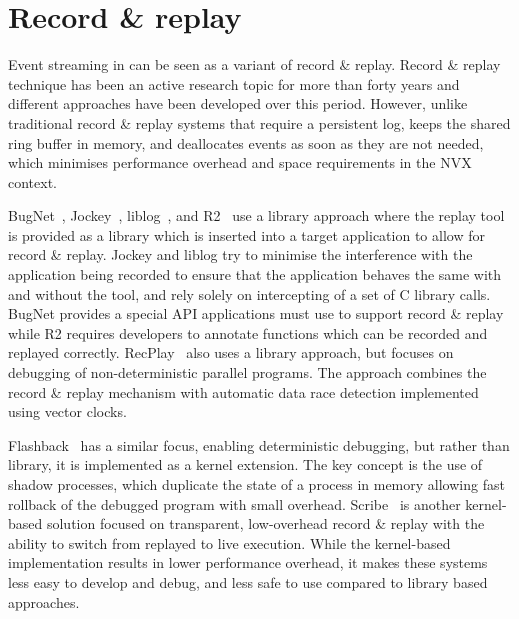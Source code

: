 \section{Record \& replay}
\label{related:record}

Event streaming in \varan can be seen as a variant of record \& replay. Record
\& replay technique has been an active research topic for more than forty years
and different approaches have been developed over this period. However, unlike
traditional record \& replay systems that require a persistent log, \varan keeps
the shared ring buffer in memory, and deallocates events as soon as they are
not needed, which minimises performance overhead and space requirements in the
NVX context.


BugNet~\cite{bugnet}, Jockey~\cite{jockey}, liblog~\cite{geels06}, and
R2~\cite{r2} use a library approach where the replay tool is provided as a
library which is inserted into a target application to allow for record \&
replay. Jockey and liblog try to minimise the interference with the application
being recorded to ensure that the application behaves the same with and without
the tool, and rely solely on intercepting of a set of C library calls. BugNet
provides a special API applications must use to support record \& replay while
R2 requires developers to annotate functions which can be recorded and replayed
correctly. RecPlay~\cite{recplay} also uses a library approach, but focuses on
debugging of non-deterministic parallel programs. The approach combines the
record \& replay mechanism with automatic data race detection implemented using
vector clocks.

Flashback~\cite{flashback} has a similar focus, enabling deterministic
debugging, but rather than library, it is implemented as a kernel extension.
The key concept is the use of shadow processes, which duplicate the state of a
process in memory allowing fast rollback of the debugged program with small
overhead. Scribe~\cite{scribe} is another kernel-based solution focused on
transparent, low-overhead record \& replay with the ability to switch from
replayed to live execution. While the kernel-based implementation results in
lower performance overhead, it makes these systems less easy to develop and
debug, and less safe to use compared to library based approaches.


